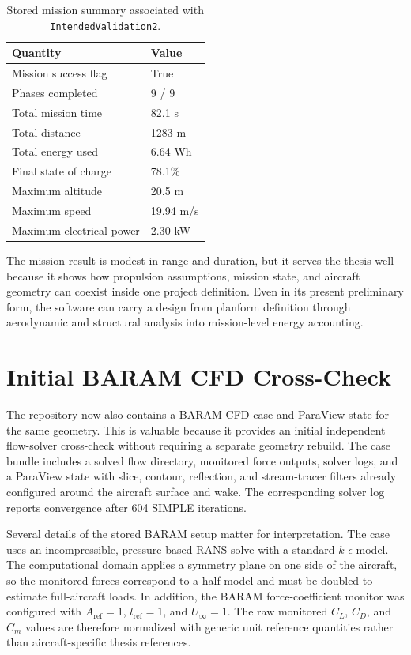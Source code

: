 \documentclass[12pt]{report}
\begin{document}
\begin{table}[htbp]
\centering
\caption{Stored mission summary associated with \texttt{IntendedValidation2}.}
\label{tab:intendedvalidation2-mission}
\begin{tabular}{ll}
\toprule
\textbf{Quantity} & \textbf{Value} \\
\midrule
Mission success flag & True \\
Phases completed & 9 / 9 \\
Total mission time & 82.1 s \\
Total distance & 1283 m \\
Total energy used & 6.64 Wh \\
Final state of charge & 78.1\% \\
Maximum altitude & 20.5 m \\
Maximum speed & 19.94 m/s \\
Maximum electrical power & 2.30 kW \\
\bottomrule
\end{tabular}
\end{table}

The mission result is modest in range and duration, but it serves the thesis well because it shows how propulsion assumptions, mission state, and aircraft geometry can coexist inside one project definition. Even in its present preliminary form, the software can carry a design from planform definition through aerodynamic and structural analysis into mission-level energy accounting.

\section{Initial BARAM CFD Cross-Check}
The repository now also contains a BARAM CFD case and ParaView state for the same geometry. This is valuable because it provides an initial independent flow-solver cross-check without requiring a separate geometry rebuild. The case bundle includes a solved flow directory, monitored force outputs, solver logs, and a ParaView state with slice, contour, reflection, and stream-tracer filters already configured around the aircraft surface and wake. The corresponding solver log reports convergence after 604 SIMPLE iterations.

Several details of the stored BARAM setup matter for interpretation. The case uses an incompressible, pressure-based RANS solve with a standard \(k\)-\(\epsilon\) model. The computational domain applies a symmetry plane on one side of the aircraft, so the monitored forces correspond to a half-model and must be doubled to estimate full-aircraft loads. In addition, the BARAM force-coefficient monitor was configured with \(A_{\mathrm{ref}} = 1\), \(l_{\mathrm{ref}} = 1\), and \(U_{\infty} = 1\). The raw monitored \(C_L\), \(C_D\), and \(C_m\) values are therefore normalized with generic unit reference quantities rather than aircraft-specific thesis references.
\end{document}
